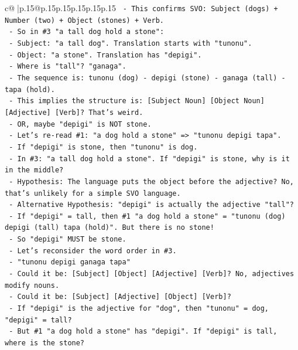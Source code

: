 \documentclass{article}
\begin{document}
{\begin{supertabular}{c@{$\;$}|p{.15\linewidth}@{}p{.15\linewidth}p{.15\linewidth}p{.15\linewidth}p{.15\linewidth}p{.15\linewidth}}
{{{\texttt{  {-} This confirms SVO: Subject (dogs) + Number (two) + Object (stones) + Verb.} \\
\texttt{  {-} So in \#3 "a tall dog hold a stone":} \\
\texttt{    {-} Subject: "a tall dog". Translation starts with "tunonu".} \\
\texttt{    {-} Object: "a stone". Translation has "depigi".} \\
\texttt{    {-} Where is "tall"? "ganaga".} \\
\texttt{    {-} The sequence is: tunonu (dog) {-} depigi (stone) {-} ganaga (tall) {-} tapa (hold).} \\
\texttt{    {-} This implies the structure is: {[}Subject Noun{]} {[}Object Noun{]} {[}Adjective{]} {[}Verb{]}? That's weird.} \\
\texttt{    {-} OR, maybe "depigi" is NOT stone.} \\
\texttt{    {-} Let's re{-}read \#1: "a dog hold a stone" => "tunonu depigi tapa".} \\
\texttt{    {-} If "depigi" is stone, then "tunonu" is dog.} \\
\texttt{    {-} In \#3: "a tall dog hold a stone". If "depigi" is stone, why is it in the middle?} \\
\texttt{    {-} Hypothesis: The language puts the object before the adjective? No, that's unlikely for a simple SVO language.} \\
\texttt{    {-} Alternative Hypothesis: "depigi" is actually the adjective "tall"?} \\
\texttt{      {-} If "depigi" = tall, then \#1 "a dog hold a stone" = "tunonu (dog) depigi (tall) tapa (hold)". But there is no stone!} \\
\texttt{      {-} So "depigi" MUST be stone.} \\
\texttt{    {-} Let's reconsider the word order in \#3.} \\
\texttt{      {-} "tunonu depigi ganaga tapa"} \\
\texttt{      {-} Could it be: {[}Subject{]} {[}Object{]} {[}Adjective{]} {[}Verb{]}? No, adjectives modify nouns.} \\
\texttt{      {-} Could it be: {[}Subject{]} {[}Adjective{]} {[}Object{]} {[}Verb{]}?} \\
\texttt{        {-} If "depigi" is the adjective for "dog", then "tunonu" = dog, "depigi" = tall?} \\
\texttt{        {-} But \#1 "a dog hold a stone" has "depigi". If "depigi" is tall, where is the stone?} \\
}}}
\end{supertabular}}
\end{document}
